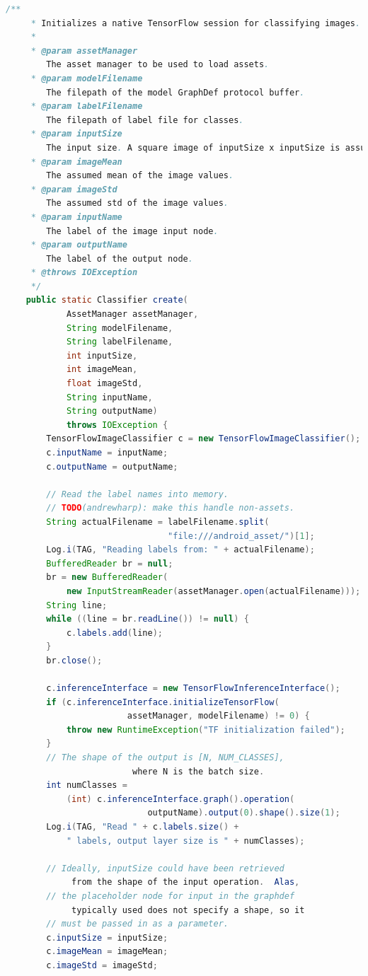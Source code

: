 \documentclass[UTF8, Microsoft YaHei]{book}
\begin{document}
\begin{small}
\begin{lstlisting}[language=java]
    /**
     * Initializes a native TensorFlow session for classifying images.
     *
     * @param assetManager
     	The asset manager to be used to load assets.
     * @param modelFilename
     	The filepath of the model GraphDef protocol buffer.
     * @param labelFilename
     	The filepath of label file for classes.
     * @param inputSize
     	The input size. A square image of inputSize x inputSize is assumed.
     * @param imageMean
     	The assumed mean of the image values.
     * @param imageStd
     	The assumed std of the image values.
     * @param inputName
     	The label of the image input node.
     * @param outputName
     	The label of the output node.
     * @throws IOException
     */
    public static Classifier create(
            AssetManager assetManager,
            String modelFilename,
            String labelFilename,
            int inputSize,
            int imageMean,
            float imageStd,
            String inputName,
            String outputName)
            throws IOException {
        TensorFlowImageClassifier c = new TensorFlowImageClassifier();
        c.inputName = inputName;
        c.outputName = outputName;

        // Read the label names into memory.
        // TODO(andrewharp): make this handle non-assets.
        String actualFilename = labelFilename.split(
        						"file:///android_asset/")[1];
        Log.i(TAG, "Reading labels from: " + actualFilename);
        BufferedReader br = null;
        br = new BufferedReader(
        	new InputStreamReader(assetManager.open(actualFilename)));
        String line;
        while ((line = br.readLine()) != null) {
            c.labels.add(line);
        }
        br.close();

        c.inferenceInterface = new TensorFlowInferenceInterface();
        if (c.inferenceInterface.initializeTensorFlow(
        				assetManager, modelFilename) != 0) {
            throw new RuntimeException("TF initialization failed");
        }
        // The shape of the output is [N, NUM_CLASSES],
        				 where N is the batch size.
        int numClasses =
            (int) c.inferenceInterface.graph().operation(
            				outputName).output(0).shape().size(1);
        Log.i(TAG, "Read " + c.labels.size() +
        	" labels, output layer size is " + numClasses);

        // Ideally, inputSize could have been retrieved
        	 from the shape of the input operation.  Alas,
        // the placeholder node for input in the graphdef
        	 typically used does not specify a shape, so it
        // must be passed in as a parameter.
        c.inputSize = inputSize;
        c.imageMean = imageMean;
        c.imageStd = imageStd;


\end{lstlisting}
\end{small}
\end{document}
